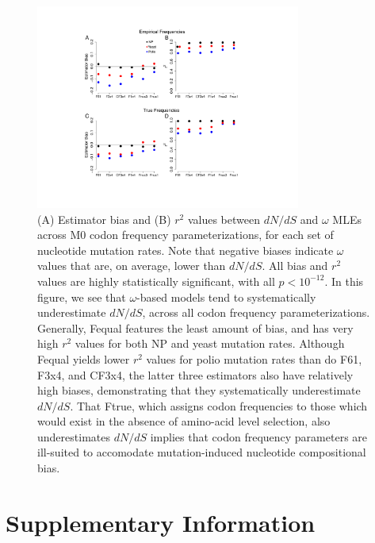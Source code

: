 \documentclass{pnastwo}
\newcommand{\xline}[0]{\noindent\underline{\makebox[0.15cm][l]{}}}
\begin{document}
\begin{figure}[htbp]
	\centerline{\includegraphics[width=8.7cm]{figures/MainText/nyp_bias_r2.pdf}}
	\caption{\label{nyp_bias_r2} (A) Estimator bias and (B) $r^2$ values between $dN/dS$ and $\omega$ MLEs across M0 codon frequency parameterizations, for each set of nucleotide mutation rates. Note that negative biases indicate $\omega$ values that are, on average, lower than $dN/dS$. All bias and $r^2$ values are highly statistically significant, with all $p < 10^{-12}$. In this figure, we see that $\omega$-based models tend to systematically underestimate $dN/dS$, across all codon frequency parameterizations. Generally, F\protect\xline equal features the least amount of bias, and has very high $r^2$ values for both NP and yeast mutation rates. Although Fequal yields lower $r^2$ values for polio mutation rates than do F61, F3x4, and CF3x4, the latter three estimators also have relatively high biases, demonstrating that they systematically underestimate $dN/dS$. That Ftrue, which assigns codon frequencies to those which would exist in the absence of amino-acid level selection, also underestimates $dN/dS$ implies that codon frequency parameters are ill-suited to accomodate mutation-induced nucleotide compositional bias.}	
\end{figure}
	
\clearpage

	
\section{Supplementary Information}

\vspace{2cm}
\end{document}
